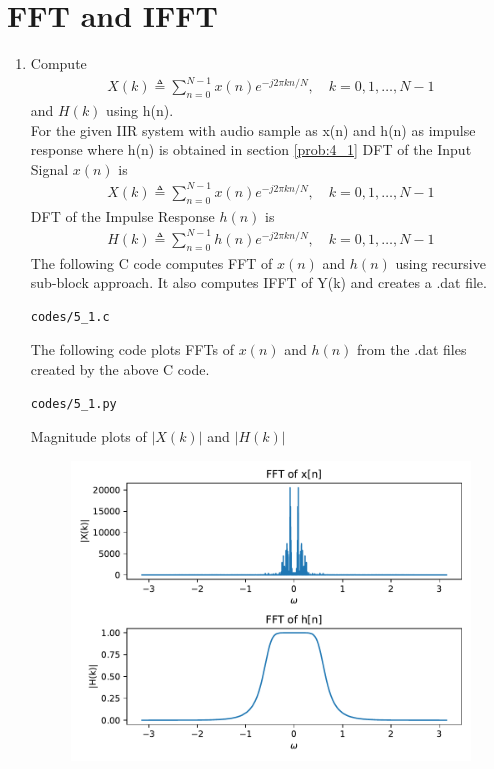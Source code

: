 \documentclass[journal,12pt,twocolumn]{IEEEtran}
\renewcommand\thesection{\arabic{section}}
\begin{document}
\section{FFT and IFFT}
\begin{enumerate}[label=\thesection.\arabic*
,ref=\thesection.\theenumi]
\item Compute
\begin{align}
        X(k) \triangleq \sum_{n=0}^{N-1} x(n) e^{-j 2 \pi k n / N}, \quad k=0,1, \ldots, N-1
\end{align}
and $H(k)$ using h(n).
\\
\solution
For the given IIR system with audio sample as x(n) and h(n) as impulse response where h(n) is obtained in section \ref{prob:4_1} 
DFT of the Input Signal $x(n)$ is 
\begin{align}
    X(k) \triangleq \sum_{n=0}^{N-1} x(n) e^{-j 2 \pi k n / N}, \quad k=0,1, \ldots, N-1
\end{align}
DFT of the Impulse Response $h(n)$ is 
\begin{align}
    H(k) \triangleq \sum_{n=0}^{N-1} h(n) e^{-j 2 \pi k n / N}, \quad k=0,1, \ldots, N-1
\end{align}
The following C code computes FFT of $x(n)$ and $h(n)$ using recursive sub-block approach. It also computes IFFT of Y(k) and creates a .dat file.
\begin{lstlisting}
codes/5_1.c
\end{lstlisting}
The following code plots FFTs of $x(n)$ and $h(n)$ from the .dat files created by the above C code.
\begin{lstlisting}
codes/5_1.py
\end{lstlisting}
Magnitude plots of $|X(k)|$ and $|H(k)|$
\begin{figure}[!ht]
\centering
\includegraphics[width=\columnwidth]{./figs/5_1}

\end{figure}
\end{enumerate}
\end{document}
